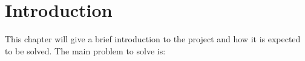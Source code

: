 \chapter{Introduction}
This chapter will give a brief introduction to the project and how it is expected to be solved.
The main problem to solve is:

